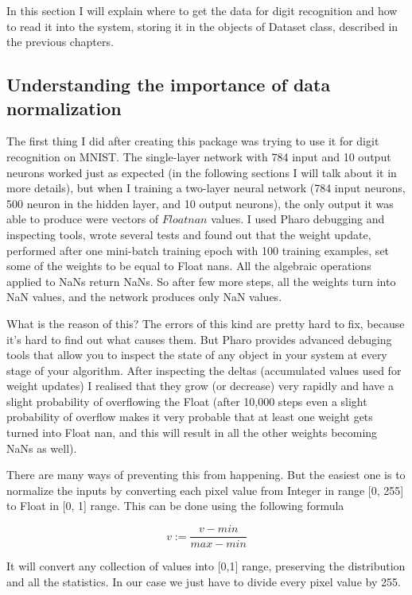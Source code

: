 In this section I will explain where to get the data for digit recognition and how to read it into the system, storing it in the objects of Dataset class, described in the previous chapters.

\subsection{Understanding the importance of data normalization}
The first thing I did after creating this package was trying to use it for digit recognition on MNIST. The single-layer network with 784 input and 10 output neurons worked just as expected (in the following sections I will talk about it in more details), but when I training a two-layer neural network (784 input neurons, 500 neuron in the hidden layer, and 10 output neurons), the only output it was able to produce were vectors of $Float nan$ values. I used Pharo debugging and inspecting tools, wrote several tests and found out that the weight update, performed after one mini-batch training epoch with 100 training examples, set some of the weights to be equal to Float nans. All the algebraic operations applied to NaNs return NaNs. So after few more steps, all the weights turn into NaN values, and the network produces only NaN values.

What is the reason of this? The errors of this kind are pretty hard to fix, because it's hard to find out what causes them. But Pharo provides advanced debuging tools that allow you to inspect the state of any object in your system at every stage of your algorithm. After inspecting the deltas (accumulated values used for weight updates) I realised that they grow (or decrease) very rapidly and have a slight probability of overflowing the Float (after 10,000 steps even a slight probability of overflow makes it very probable that at least one weight gets turned into Float nan, and this will result in all the other weights becoming NaNs as well).

There are many ways of preventing this from happening. But the easiest one is to normalize the inputs by converting each pixel value from Integer in range [0, 255] to Float in [0, 1] range. This can be done using the following formula

\[ v := \frac{v - min}{max - min} \]

It will convert any collection of values into [0,1] range, preserving the distribution and all the statistics. In our case we just have to divide every pixel value by 255.

